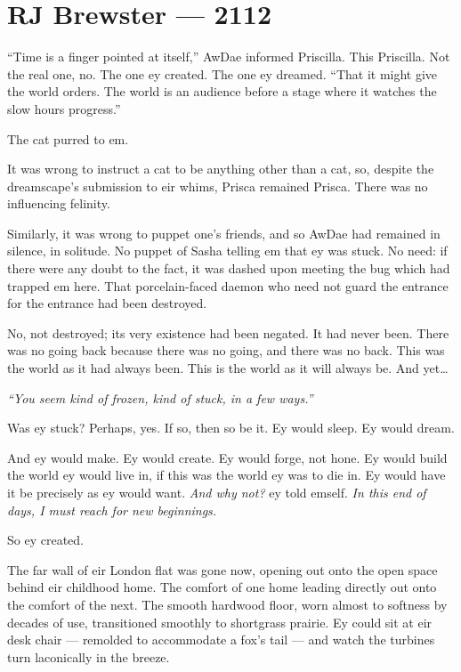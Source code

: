 \hypertarget{rj-brewster-2112}{%
\chapter*{RJ Brewster — 2112}\label{rj-brewster-2112}}

``Time is a finger pointed at itself,'' AwDae informed Priscilla. This Priscilla. Not the real one, no. The one ey created. The one ey dreamed. ``That it might give the world orders. The world is an audience before a stage where it watches the slow hours progress.''

The cat purred to em.

It was wrong to instruct a cat to be anything other than a cat, so, despite the dreamscape's submission to eir whims, Prisca remained Prisca. There was no influencing felinity.

Similarly, it was wrong to puppet one's friends, and so AwDae had remained in silence, in solitude. No puppet of Sasha telling em that ey was stuck. No need: if there were any doubt to the fact, it was dashed upon meeting the bug which had trapped em here. That porcelain-faced daemon who need not guard the entrance for the entrance had been destroyed.

No, not destroyed; its very existence had been negated. It had never been. There was no going back because there was no going, and there was no back. This was the world as it had always been. This is the world as it will always be. And yet\ldots{}

\emph{``You seem kind of frozen, kind of stuck, in a few ways.''}

Was ey stuck? Perhaps, yes. If so, then so be it. Ey would sleep. Ey would dream.

And ey would make. Ey would create. Ey would forge, not hone. Ey would build the world ey would live in, if this was the world ey was to die in. Ey would have it be precisely as ey would want. \emph{And why not?} ey told emself. \emph{In this end of days, I must reach for new beginnings.}

So ey created.

The far wall of eir London flat was gone now, opening out onto the open space behind eir childhood home. The comfort of one home leading directly out onto the comfort of the next. The smooth hardwood floor, worn almost to softness by decades of use, transitioned smoothly to shortgrass prairie. Ey could sit at eir desk chair — remolded to accommodate a fox's tail — and watch the turbines turn laconically in the breeze.

